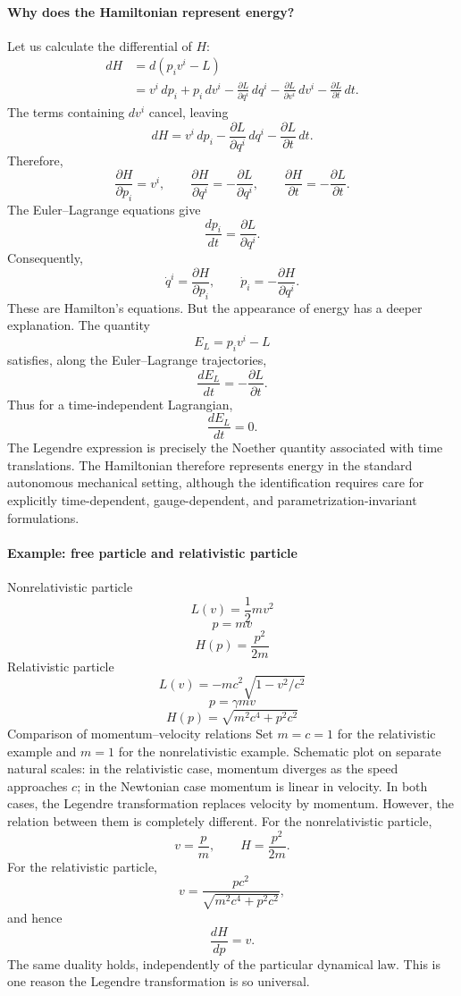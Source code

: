 \paragraph{Why does the Hamiltonian represent energy?}
Let us calculate the differential of \(H\):
\[
\begin{aligned}
dH
&=d(p_iv^i-L)\\
&=v^i\,dp_i+p_i\,dv^i
-\frac{\partial L}{\partial q^i}\,dq^i
-\frac{\partial L}{\partial v^i}\,dv^i
-\frac{\partial L}{\partial t}\,dt.
\end{aligned}
\]
The terms containing \(dv^i\) cancel, leaving
\[
\boxed{
dH=v^i\,dp_i
-\frac{\partial L}{\partial q^i}\,dq^i
-\frac{\partial L}{\partial t}\,dt.
}
\]
Therefore,
\[
\boxed{
\frac{\partial H}{\partial p_i}=v^i,
\qquad
\frac{\partial H}{\partial q^i}
=-\frac{\partial L}{\partial q^i},
\qquad
\frac{\partial H}{\partial t}
=-\frac{\partial L}{\partial t}.
}
\]
The Euler–Lagrange equations give
\[
\frac{dp_i}{dt}=\frac{\partial L}{\partial q^i}.
\]
Consequently,
\[
\boxed{
\dot q^i=\frac{\partial H}{\partial p_i},
\qquad
\dot p_i=-\frac{\partial H}{\partial q^i}.
}
\]
These are Hamilton's equations.
But the appearance of energy has a deeper explanation.
The quantity
\[
E_L=p_iv^i-L
\]
satisfies, along the Euler–Lagrange trajectories,
\[
\frac{dE_L}{dt}=-\frac{\partial L}{\partial t}.
\]
Thus for a time-independent Lagrangian,
\[
\boxed{\frac{dE_L}{dt}=0.}
\]
The Legendre expression is precisely the Noether quantity associated with time
translations.
The Hamiltonian therefore represents energy in the standard autonomous
mechanical setting, although the identification requires care for explicitly
time-dependent, gauge-dependent, and parametrization-invariant formulations.

\paragraph{Example: free particle and relativistic particle}
Nonrelativistic particle
\[
L(v)=\frac12 mv^2
\]
\[
p=mv
\]
\[
H(p)=\frac{p^2}{2m}
\]
Relativistic particle
\[
L(v)=-mc^2\sqrt{1-v^2/c^2}
\]
\[
p=\gamma mv
\]
\[
H(p)=\sqrt{m^2c^4+p^2c^2}
\]
Comparison of momentum–velocity relations
Set \(m=c=1\) for the relativistic example and \(m=1\) for the nonrelativistic
example.
Schematic plot on separate natural scales: in the relativistic case, momentum
diverges as the speed approaches \(c\); in the Newtonian case momentum is
linear in velocity.
In both cases, the Legendre transformation replaces velocity by momentum.
However, the relation between them is completely different.
For the nonrelativistic particle,
\[
v=\frac pm,\qquad
H=\frac{p^2}{2m}.
\]
For the relativistic particle,
\[
v=\frac{pc^2}{\sqrt{m^2c^4+p^2c^2}},
\]
and hence
\[
\frac{dH}{dp}=v.
\]
The same duality holds, independently of the particular dynamical law.
This is one reason the Legendre transformation is so universal.

